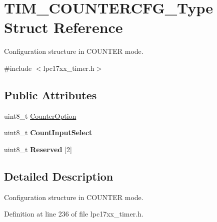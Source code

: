 \hypertarget{struct_t_i_m___c_o_u_n_t_e_r_c_f_g___type}{\section{\-T\-I\-M\-\_\-\-C\-O\-U\-N\-T\-E\-R\-C\-F\-G\-\_\-\-Type \-Struct \-Reference}
\label{struct_t_i_m___c_o_u_n_t_e_r_c_f_g___type}
}


\-Configuration structure in \-C\-O\-U\-N\-T\-E\-R mode.  




{\ttfamily \#include $<$lpc17xx\-\_\-timer.\-h$>$}

\subsection*{\-Public \-Attributes}
\begin{DoxyCompactItemize}
\item 
uint8\-\_\-t \hyperlink{struct_t_i_m___c_o_u_n_t_e_r_c_f_g___type_a1d50721be74d896d737f1452506fd14b}{\-Counter\-Option}
\item 
\hypertarget{struct_t_i_m___c_o_u_n_t_e_r_c_f_g___type_ae9450f665c8e50bb5b444e76fed38199}{uint8\-\_\-t {\bfseries \-Count\-Input\-Select}}\label{struct_t_i_m___c_o_u_n_t_e_r_c_f_g___type_ae9450f665c8e50bb5b444e76fed38199}

\item 
\hypertarget{struct_t_i_m___c_o_u_n_t_e_r_c_f_g___type_a535be1ae6d0de78ab0e719c64382cb31}{uint8\-\_\-t {\bfseries \-Reserved} \mbox{[}2\mbox{]}}\label{struct_t_i_m___c_o_u_n_t_e_r_c_f_g___type_a535be1ae6d0de78ab0e719c64382cb31}

\end{DoxyCompactItemize}


\subsection{\-Detailed \-Description}
\-Configuration structure in \-C\-O\-U\-N\-T\-E\-R mode. 

\-Definition at line 236 of file lpc17xx\-\_\-timer.\-h.



